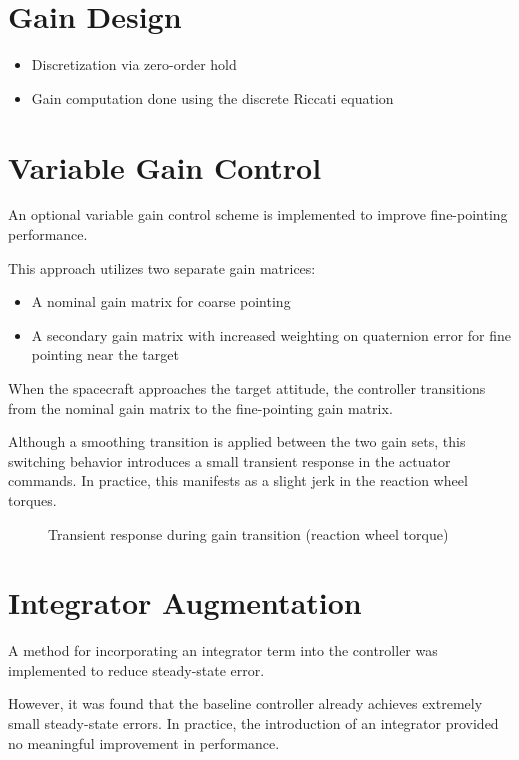 \section{Gain Design}

\begin{itemize}
	\item Discretization via zero-order hold
	\item Gain computation done using the discrete Riccati equation
\end{itemize}

\section{Variable Gain Control}

An optional variable gain control scheme is implemented to improve fine-pointing performance.

This approach utilizes two separate gain matrices:

\begin{itemize}
	\item A nominal gain matrix for coarse pointing
	\item A secondary gain matrix with increased weighting on quaternion error for fine pointing near the target
\end{itemize}

When the spacecraft approaches the target attitude, the controller transitions from the nominal gain matrix to the fine-pointing gain matrix.

Although a smoothing transition is applied between the two gain sets, this switching behavior introduces a small transient response in the actuator commands. In practice, this manifests as a slight jerk in the reaction wheel torques.

\begin{figure}[h]
	\centering
	\caption{Transient response during gain transition (reaction wheel torque)}
\end{figure}

\section{Integrator Augmentation}

A method for incorporating an integrator term into the controller was implemented to reduce steady-state error.

However, it was found that the baseline controller already achieves extremely small steady-state errors. In practice, the introduction of an integrator provided no meaningful improvement in performance.

